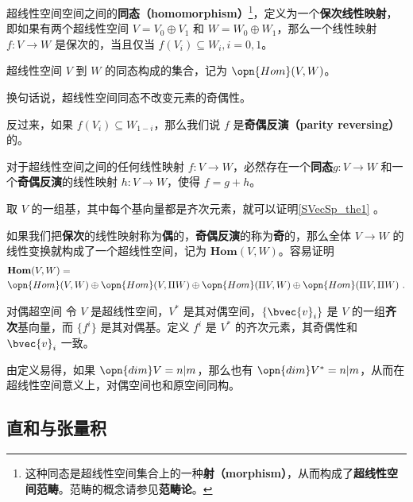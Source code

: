 超线性空间空间之间的\textbf{同态（homomorphism）}\footnote{这种同态是超线性空间集合上的一种\textbf{射（morphism）}，从而构成了\textbf{超线性空间范畴}。范畴的概念请参见\textbf{范畴论}。}，定义为一个\textbf{保次线性映射}，即如果有两个超线性空间 $V=V_0\oplus V_1$ 和 $W=W_0\oplus W_1$，那么一个线性映射 $f:V\to W$ 是保次的，当且仅当 $f(V_i)\subseteq W_i, i=0, 1$。

\begin{definition}{}
超线性空间 $V$ 到 $W$ 的同态构成的集合，记为 $\opn{Hom}(V, W)$。
\end{definition}

换句话说，超线性空间同态不改变元素的奇偶性。

反过来，如果 $f(V_i)\subseteq W_{1-i}$，那么我们说 $f$ 是\textbf{奇偶反演（parity reversing）}的。

\begin{theorem}{}\label{SVecSp_the1}
对于超线性空间之间的任何线性映射 $f:V\to W$，必然存在一个\textbf{同态}$g:V\to W$ 和一个\textbf{奇偶反演}的线性映射 $h:V\to W$，使得 $f=g+h$。
\end{theorem}

取 $V$ 的一组基，其中每个基向量都是齐次元素，就可以证明\autoref{SVecSp_the1} 。

如果我们把\textbf{保次}的线性映射称为\textbf{偶}的，\textbf{奇偶反演}的称为\textbf{奇}的，那么全体 $V\to W$ 的线性变换就构成了一个超线性空间，记为 $\mathbf{Hom}(V, W)$。容易证明
\begin{equation}
\begin{aligned}
&\mathbf{Hom}(V, W)=\\&\opn{Hom}(V, W)\oplus\opn{Hom}(V, \Pi W)\oplus\opn{Hom}(\Pi V, W)\oplus\opn{Hom}(\Pi V, \Pi W)~.
\end{aligned}
\end{equation}

\begin{definition}{对偶超空间}
令 $V$ 是超线性空间，$V^*$ 是其对偶空间，$\{\bvec{v}_i\}$ 是 $V$ 的一组\textbf{齐次}基向量，而 $\{f^i\}$ 是其对偶基。定义 $f^i$ 是 $V^*$ 的齐次元素，其奇偶性和 $\bvec{v}_i$ 一致。
\end{definition}

由定义易得，如果 $\opn{dim}V=n|m$，那么也有 $\opn{dim}V^*=n|m$，从而在超线性空间意义上，对偶空间也和原空间同构。


\subsection{直和与张量积}

